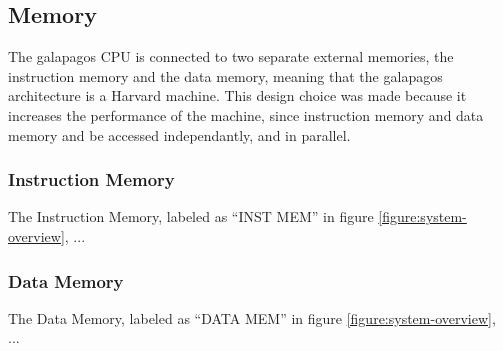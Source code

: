 
\subsection{Memory}

The \Gls{galapagos} CPU is connected to two separate external memories, the instruction memory and the data memory, meaning that the \Gls{galapagos} architecture is a Harvard machine.
This design choice was made because it increases the performance of the machine, since instruction memory and data memory and be accessed independantly, and in parallel. 

\subsubsection{Instruction Memory}

The Instruction Memory, labeled as ``INST MEM'' in figure \vref{figure:system-overview}, ...

\subsubsection{Data Memory}

The Data Memory, labeled as ``DATA MEM'' in figure \vref{figure:system-overview}, ...

